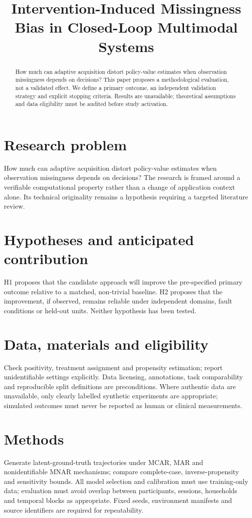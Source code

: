 \documentclass[11pt,a4paper]{article}
\title{Intervention-Induced Missingness Bias in Closed-Loop Multimodal Systems}
\author{}
\date{}
\begin{document}
\maketitle
\begin{abstract}
How much can adaptive acquisition distort policy-value estimates when observation missingness depends on decisions? This paper proposes a methodological evaluation, not a validated effect. We define a primary outcome, an independent validation strategy and explicit stopping criteria. Results are unavailable; theoretical assumptions and data eligibility must be audited before study activation.
\end{abstract}
\section{Research problem}
How much can adaptive acquisition distort policy-value estimates when observation missingness depends on decisions? The research is framed around a verifiable computational property rather than a change of application context alone. Its technical originality remains a hypothesis requiring a targeted literature review.
\section{Hypotheses and anticipated contribution}
H1 proposes that the candidate approach will improve the pre-specified primary outcome relative to a matched, non-trivial baseline. H2 proposes that the improvement, if observed, remains reliable under independent domains, fault conditions or held-out units. Neither hypothesis has been tested.
\section{Data, materials and eligibility}
Check positivity, treatment assignment and propensity estimation; report unidentifiable settings explicitly. Data licensing, annotations, task comparability and reproducible split definitions are preconditions. Where authentic data are unavailable, only clearly labelled synthetic experiments are appropriate; simulated outcomes must never be reported as human or clinical measurements.
\section{Methods}
Generate latent-ground-truth trajectories under MCAR, MAR and nonidentifiable MNAR mechanisms; compare complete-case, inverse-propensity and sensitivity bounds. All model selection and calibration must use training-only data; evaluation must avoid overlap between participants, sessions, households and temporal blocks as appropriate. Fixed seeds, environment manifests and source identifiers are required for repeatability.
\end{document}

